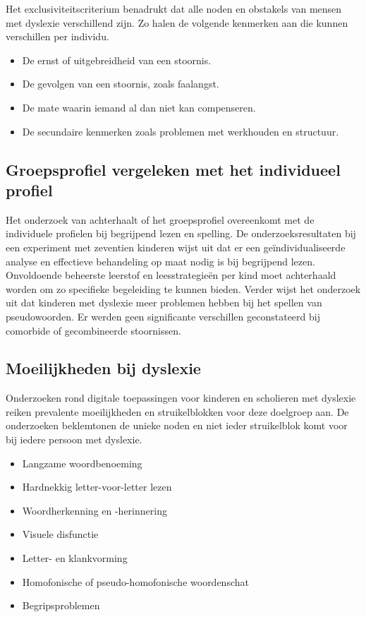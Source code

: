 Het exclusiviteitscriterium benadrukt dat alle noden en obstakels van mensen met dyslexie verschillend zijn. Zo halen \textcite{VanVreckem2015, Ghesquiere2018} de volgende kenmerken aan die kunnen verschillen per individu.

\begin{itemize}
	\item De ernst of uitgebreidheid van een stoornis.
	\item De gevolgen van een stoornis, zoals faalangst.
	\item De mate waarin iemand al dan niet kan compenseren.
	\item De secundaire kenmerken zoals problemen met werkhouden en structuur.
\end{itemize}

\subsection{Groepsprofiel vergeleken met het individueel profiel}


Het onderzoek van \textcite{VanVreckem2015} achterhaalt of het groepsprofiel overeenkomt met de individuele profielen bij begrijpend lezen en spelling. De onderzoeksresultaten bij een experiment met zeventien kinderen wijst uit dat er een geïndividualiseerde analyse en effectieve behandeling op maat nodig is bij begrijpend lezen. Onvoldoende beheerste leerstof en leesstrategieën per kind moet achterhaald worden om zo specifieke begeleiding te kunnen bieden. Verder wijst het onderzoek uit dat kinderen met dyslexie meer problemen hebben bij het spellen van pseudowoorden. Er werden geen significante verschillen geconstateerd bij comorbide of gecombineerde stoornissen.



\subsection{Moeilijkheden bij dyslexie}

Onderzoeken rond digitale toepassingen voor kinderen en scholieren met dyslexie reiken prevalente moeilijkheden en struikelblokken voor deze doelgroep aan. De onderzoeken beklemtonen de unieke noden en niet ieder struikelblok komt voor bij iedere persoon met dyslexie.

\begin{itemize}
	\item Langzame woordbenoeming
	\item Hardnekkig letter-voor-letter lezen
	\item Woordherkenning en -herinnering
	\item Visuele disfunctie
	\item Letter- en klankvorming
	\item Homofonische of pseudo-homofonische woordenschat
	\item Begripsproblemen
\end{itemize}

